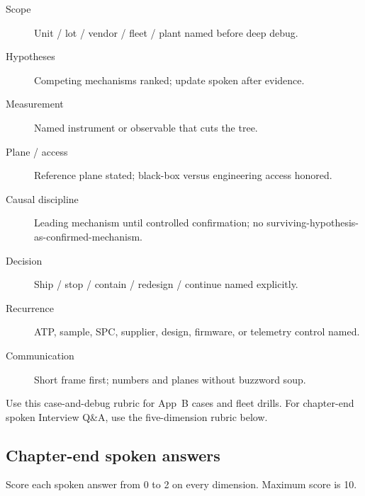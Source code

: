 \begin{description}
\item[Scope] Unit / lot / vendor / fleet / plant named before deep debug.
\item[Hypotheses] Competing mechanisms ranked; update spoken after evidence.
\item[Measurement] Named instrument or observable that cuts the tree.
\item[Plane / access] Reference plane stated; black-box versus engineering
      access honored.
\item[Causal discipline] Leading mechanism until controlled confirmation; no
      surviving-hypothesis-as-confirmed-mechanism.
\item[Decision] Ship / stop / contain / redesign / continue named explicitly.
\item[Recurrence] ATP, sample, SPC, supplier, design, firmware, or telemetry
      control named.
\item[Communication] Short frame first; numbers and planes without buzzword
      soup.
\end{description}

Use this case-and-debug rubric for App~B cases and fleet drills. For
chapter-end spoken Interview Q\&A, use the five-dimension rubric below.

\subsection{Chapter-end spoken answers}
\label{sec:chapter-interview-rubric}

Score each spoken answer from 0 to 2 on every dimension. Maximum score is 10.

